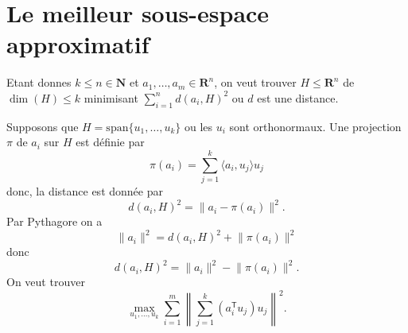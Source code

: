 \section{Le meilleur sous-espace approximatif}
Etant donnes $k\le n \in \mathbf{N}$ et $a_{1},\dots,a_{m}\in \mathbf{R}^{n}$, on veut trouver $H\le \mathbf{R}^{n}$ de $\dim(H)\le k$ minimisant $\sum _{i=1}^{n}d(a_{i},H)^{2}$ ou $d$ est une distance.

Supposons que $H=\mathrm{span}\{ u_{1},\dots,u_{k} \}$ ou les $u_{i}$ sont orthonormaux. Une projection $\pi$ de $a_{i}$ sur $H$ est définie par
$$
\pi(a_{i})=\sum_{j=1}^{k} \langle a_{i},u_{j} \rangle u_{j}
$$
donc, la distance est donnée par
$$
d(a_{i},H)^{2}=\lVert a_{i}-\pi(a_{i}) \rVert ^{2}.
$$
Par Pythagore on a
$$
\lVert a_{i} \rVert ^{2}=d(a_{i},H)^{2}+\lVert \pi(a_{i}) \rVert ^{2}
$$
donc
$$
d(a_{i},H)^{2}=\lVert a_{i} \rVert ^{2}-\lVert \pi(a_{i}) \rVert ^{2}.
$$
On veut trouver
$$
\max_{u_{1},\dots,u_{k}} \sum_{i=1}^{m} \left\lVert \sum_{j=1}^{k} (a_{i}^{\mathsf{T}}u_{j})u_{j} \right\rVert ^{2}.
$$